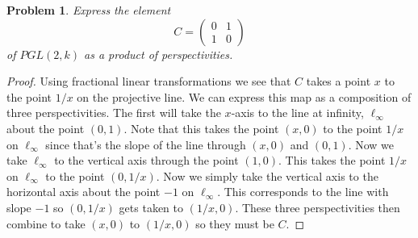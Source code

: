 \documentclass{article}
\newtheorem{problem}{Problem}
\begin{document}
\begin{problem}
Express the element
\[
C =
\left (
\begin{array}{cc}
0 & 1\\
1 & 0
\end{array}
\right )
\]
of $PGL(2,k)$ as a product of perspectivities.
\end{problem}
\begin{proof}
Using fractional linear transformations we see that $C$ takes a point $x$ to the point $1/x$ on the projective line. We can express this map as a composition of three perspectivities. The first will take the $x$-axis to the line at infinity, $\ell_{\infty}$
\vspace{200pt}
about the point $(0,1)$. Note that this takes the point $(x,0)$ to the point $1/x$ on $\ell_{\infty}$ since that's the slope of the line through $(x,0)$ and $(0,1)$. Now we take $\ell_{\infty}$ to the vertical axis
\vspace{200pt}
through the point $(1,0)$. This takes the point $1/x$ on $\ell_{\infty}$ to the point $(0,1/x)$. Now we simply take the vertical axis to the horizontal axis about the point $-1$ on $\ell_{\infty}$. This corresponds to the line with slope $-1$ so $(0,1/x)$ gets taken to $(1/x,0)$. These three perspectivities then combine to take $(x,0)$ to $(1/x,0)$ so they must be $C$.
\end{proof}
\end{document}
